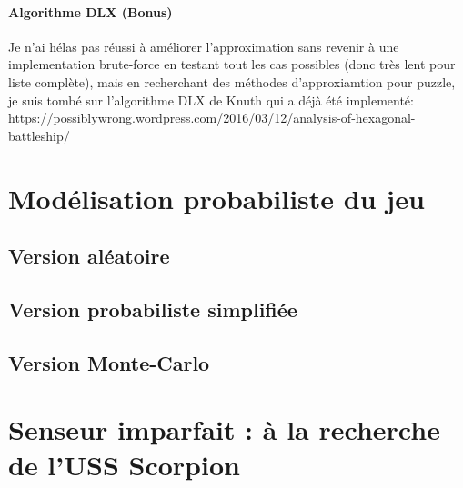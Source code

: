 \documentclass[12pt]{article}
\begin{document}
        \paragraph{Algorithme DLX (Bonus)}
        Je n'ai hélas pas réussi à améliorer l'approximation sans revenir à une implementation brute-force en testant tout les cas possibles (donc très lent pour liste complète), mais en recherchant des méthodes d'approxiamtion pour puzzle, je suis tombé sur l'algorithme DLX de Knuth qui a déjà été implementé:\\
        https://possiblywrong.wordpress.com/2016/03/12/analysis-of-hexagonal-battleship/ \\
        
\section{Modélisation probabiliste du jeu}

    \subsection{Version aléatoire}
    \subsection{Version probabiliste simplifiée}
    \subsection{Version Monte-Carlo}

\section{Senseur imparfait : à la recherche de l’USS Scorpion}

    \subsection{}
    \subsection{}
    \subsection{}
    \subsection{}
 
\end{document}
